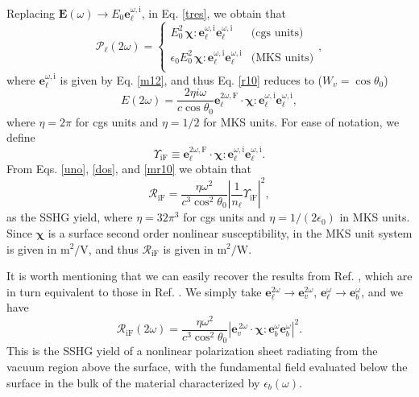 Replacing $\mathbf{E}(\omega)\to E_0\mathbf{e}^{\omega,\mathrm{i}}_\ell$,  
in Eq. \eqref{tres}, we obtain that
\begin{equation}\label{m4}
\boldsymbol{\mathcal{P}}_\ell(2\omega) = 
\left\{
\begin{array}{cc}  
E^{2}_{0}\,\boldsymbol{\chi}:
\mathbf{e}^{\omega,\mathrm{i}}_{\ell}\mathbf{e}^{\omega,\mathrm{i}}_{\ell}
& \text{(cgs units)} \\\\
\epsilon_{0}E^{2}_{0}\,\boldsymbol{\chi}:
\mathbf{e}^{\omega,\mathrm{i}}_{\ell}\mathbf{e}^{\omega,\mathrm{i}}_{\ell}
& \text{(MKS units)} \\
\end{array}
\right.,
\end{equation}
where $\mathbf{e}^{\omega,\mathrm{i}}_{\ell}$ is given by Eq. \eqref{m12},
and thus
Eq. \eqref{r10} reduces to ($W_{v}=\cos\theta_{0}$)
\begin{equation}\label{mr10}
E(2\omega) =
\frac{2\eta i \omega}{c\cos\theta_{0}}
\mathbf{e}^{2\omega,\mathrm{F}}_{\ell}\cdot\boldsymbol{\chi}:
\mathbf{e}^{\omega,\mathrm{i}}_{\ell}\mathbf{e}^{\omega,\mathrm{i}}_{\ell}
,
\end{equation}
where $\eta=2\pi$ for cgs units and $\eta=1/2$ for MKS units. For ease of
notation, we define
\begin{equation}\label{mc0}
\Upsilon_{\mathrm{iF}}
\equiv 
\mathbf{e}^{2\omega,\mathrm{F}}_{\ell}\cdot\boldsymbol{\chi}:
\mathbf{e}^{\omega,\mathrm{i}}_{\ell}\mathbf{e}^{\omega,\mathrm{i}}_{\ell}
.
\end{equation}
From Eqs. \eqref{uno},
\eqref{dos}, and \eqref{mr10} we obtain that
\begin{equation}\label{mc6}
\mathcal{R}_{\mathrm{iF}}
=\frac{\eta\omega^{2}}{c^{3}\cos^{2}\theta_{0}}
\left\vert  
\frac{1}{n_{\ell}}
\Upsilon_{\mathrm{iF}}
\right\vert^{2},
\end{equation}
as the SSHG yield, where $\eta =32\pi^3$ for cgs units and
$\eta=1/(2\epsilon_0)$ in MKS units. Since $\boldsymbol{\chi}$ is a surface
second order nonlinear susceptibility, in the MKS unit system is given in
$\mathrm{m}^{2}/\mathrm{V}$, and thus $\mathcal{R}_{\mathrm{iF}}$ is given in
$\mathrm{m}^{2}/\mathrm{W}$.

It is worth mentioning that we can easily recover the results from Ref.
\cite{mizrahiJOSA88}, which are in turn equivalent to those in Ref.
\cite{sipePRB87}. We simply take
$\mathbf{e}^{2\omega}_{\ell}\to\mathbf{e}^{2\omega}_{v}$,
$\mathbf{e}^{\omega}_{\ell}\to\mathbf{e}^{\omega}_{b}$, and we have
\begin{equation}\label{eq:m69}
\mathcal{R}_{\mathrm{iF}}(2\omega) =
\frac{\eta\omega^{2}}{c^{3}\cos^{2}\theta_{0}}
\left\vert\mathbf{e}^{\,2\omega}_{v}\cdot
\boldsymbol{\chi}:\mathbf{e}^{\omega}_{b}\mathbf{e}^{\omega}_{b}
\right\vert^{2}.
\end{equation}
This is the SSHG yield  of a nonlinear polarization sheet radiating from the
vacuum region above the surface, with the fundamental field evaluated below the
surface in the bulk of the material characterized by $\epsilon_{b}(\omega)$.

\stopcontents[chapters]
